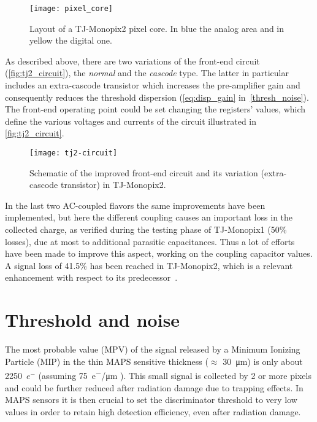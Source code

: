 \begin{figure}[h!]
\centering
\texttt{[image: pixel\_core]}
\caption{Layout of a TJ-Monopix2  pixel core. In blue the analog area and in yellow the digital one.}
\label{fig:tj2core}
\end{figure}


As described above, there are two variations of the front-end circuit (\autoref{fig:tj2_circuit}), the \textit{normal} and  the \textit{cascode} type. The latter in particular includes an extra-cascode transistor which increases the pre-amplifier gain and consequently reduces the threshold dispersion (\autoref{eq:disp_gain} in~\autoref{thresh_noise}). The front-end operating point could be set changing the registers' values, which define the various voltages and currents of the circuit illustrated in \autoref{fig:tj2_circuit}.


\begin{figure}[h!]
\centering
\texttt{[image: tj2-circuit]}
\caption{Schematic of the improved front-end circuit and its variation (extra-cascode transistor) in TJ-Monopix2.}
\label{fig:tj2_circuit}
\end{figure}


In the last two AC-coupled flavors the same improvements have been implemented, but here the different coupling causes an important loss in the collected charge, as verified during the testing phase of TJ-Monopix1 (50\% losses), due at most to additional parasitic capacitances. Thus a lot of efforts have been made to improve this aspect, working on the coupling capacitor values. A signal loss of 41.5\% has been reached in TJ-Monopix2, which is a relevant enhancement with respect to its predecessor~\cite{Moustakas:2021gjr}.




\section{Threshold and noise} \label{thresh_noise}


The most probable value (MPV) of the signal released by a Minimum Ionizing Particle (MIP) in the thin MAPS sensitive thickness ($\approx$ \SI{30}{\micro m}) is only about 2250~$e^{-}$ (assuming \SI{75}{e^{-}/\micro m} \cite{wermes_book2020}). This small signal is collected by 2 or more pixels and could be further reduced after radiation damage due to trapping effects. 
In MAPS sensors it is then crucial to set the discriminator threshold to very low values in order to retain high detection efficiency, even after radiation damage.

